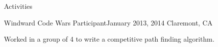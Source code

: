 \documentclass{resume} %
\begin{document}

\vspace{-2mm}

\begin{rSection}{Activities}

%




\begin{rSubsection}{Windward Code Wars Participant}{January 2013, 2014}{ }{Claremont, CA}
\item Worked in a group of 4 to write a competitive path finding algorithm. 

\end{rSubsection}

%
%
%


\end{rSection}
\end{document}
